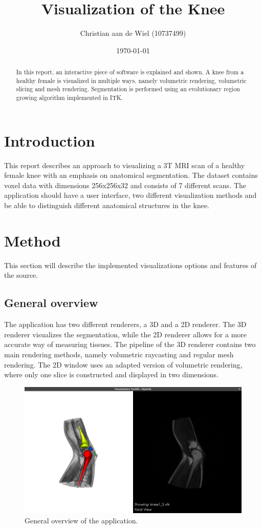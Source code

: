 \documentclass{article}
\title{Visualization of the Knee}
\author{Christian aan de Wiel (10737499)}
\date{\today}
\begin{document}
\maketitle

\begin{abstract}
In this report, an interactive piece of software is explained and shown. A knee from a healthy female is visualized in multiple ways, namely volumetric rendering, volumetric slicing and mesh rendering. Segmentation is performed using an evolutionary region growing algorithm implemented in ITK.
\end{abstract}

\section{Introduction}
This report describes an approach to visualizing a 3T MRI scan of a healthy female knee with an emphasis on anatomical segmentation. The dataset contains voxel data with dimensions 256x256x32 and consists of 7 different scans. The application should have a user interface, two different visualization methods and be able to distinguish different anatomical structures in the knee.

\section{Method}
This section will describe the implemented visualizations options and features of the source.

\subsection{General overview}
The application has two different renderers, a 3D and a 2D renderer. The 3D renderer visualizes the segmentation, while the 2D renderer allows for a more accurate way of measuring tissues. The pipeline of the 3D renderer contains two main rendering methods, namely volumetric raycasting and regular mesh rendering. The 2D window uses an adapted version of volumetric rendering, where only one slice is constructed and displayed in two dimensions.
\begin{figure}[H]
    \centering
    \includegraphics[width=\textwidth]{graphics/general.png}
    \caption{General overview of the application.}
    \label{fig:my_label}
\end{figure}
\end{document}
